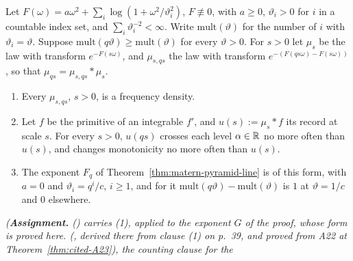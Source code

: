 \begin{proposition}
\label{prop:ladder-non-creation-line}
\leanok
Let $F(\omega) = a\omega^2 + \sum_i\log(1 + \omega^2/\vartheta_i^2)$, $F \not\equiv 0$, with
$a \ge 0$, $\vartheta_i > 0$ for $i$ in a countable index set, and $\sum_i\vartheta_i^{-2} < \infty$.
Write $\mathrm{mult}(\vartheta)$ for the number of $i$ with $\vartheta_i = \vartheta$. Suppose
$\mathrm{mult}(q\vartheta) \ge \mathrm{mult}(\vartheta)$ for every $\vartheta > 0$. For $s > 0$ let
$\mu_s$ be the law with transform $e^{-F(s\omega)}$, and $\mu_{s,qs}$ the law with transform
$e^{-(F(qs\omega) - F(s\omega))}$, so that $\mu_{qs} = \mu_{s,qs} * \mu_s$.
\begin{enumerate}
\item Every $\mu_{s,qs}$, $s > 0$, is a \Polya{} frequency density.
\item Let $f$ be the primitive of an integrable $f'$, and $u(s) := \mu_s * f$ its record at scale
$s$. For every $s > 0$, $u(qs)$ crosses each level $\alpha \in \mathbb{R}$ no more often than $u(s)$, and
changes monotonicity no more often than $u(s)$.
\item The exponent $F_q$ of Theorem~\ref{thm:matern-pyramid-line} is of this form, with $a = 0$ and
$\vartheta_i = q^i/c$, $i \ge 1$, and for it $\mathrm{mult}(q\vartheta) - \mathrm{mult}(\vartheta)$
is $1$ at $\vartheta = 1/c$ and $0$ elsewhere.
\end{enumerate}
\statusA\quad{}\quad{}\quad\emph{(\textbf{Assignment.} 
() carries (1), applied to the exponent $G$ of the
proof, whose form is proved here.  (, derived
there from clause (1) on p.~39, and proved from A22 at Theorem~\ref{thm:cited-A23}), the counting clause for the
}
\end{proposition}
